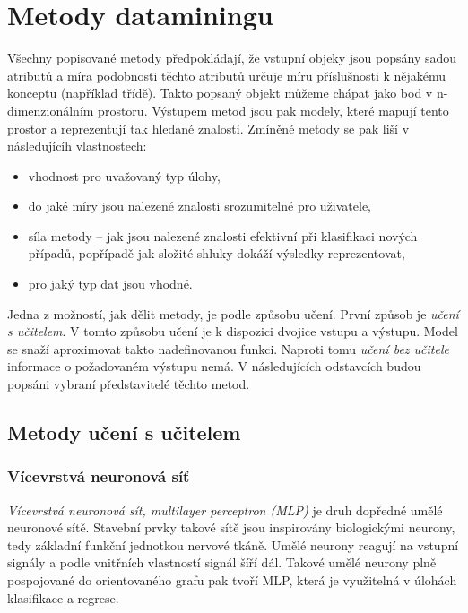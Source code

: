 \documentclass[thesis=M,czech]{FITthesis}[2012/06/26]
\begin{document}
 \section{Metody dataminingu}
Všechny popisované metody předpokládají, že vstupní objeky jsou popsány sadou atributů a míra podobnosti těchto atributů určuje míru příslušnosti k nějakému konceptu (například třídě). Takto popsaný objekt můžeme chápat jako bod v n-dimenzionálním prostoru. Výstupem metod jsou pak modely, které mapují tento prostor a reprezentují tak hledané znalosti.
Zmíněné metody se pak liší v následujícíh vlastnostech:


\begin{itemize}
\item vhodnost pro uvažovaný typ úlohy,
\item do jaké míry jsou nalezené znalosti srozumitelné pro uživatele,
\item síla metody -- jak jsou nalezené znalosti efektivní při klasifikaci nových případů, popřípadě jak složité shluky dokáží výsledky reprezentovat,
\item pro jaký typ dat jsou vhodné.
\end{itemize}


Jedna z možností, jak dělit metody, je podle způsobu učení. První způsob je \textit{učení s učitelem}. V tomto způsobu učení je k dispozici dvojice vstupu a výstupu. Model se snaží aproximovat takto nadefinovanou funkci. Naproti tomu \textit{učení bez učitele} informace o požadovaném výstupu nemá. V následujících odstavcích budou popsáni vybraní představitelé těchto metod.\cite{eurokomise}

 \subsection{Metody učení s učitelem}
  \subsubsection*{Vícevrstvá neuronová síť}
    \textit{Vícevrstvá neuronová síť, multilayer perceptron (MLP)} je druh dopředné umělé neuronové sítě.
Stavební prvky takové sítě jsou inspirovány biologickými neurony, tedy základní funkční jednotkou nervové tkáně. Umělé neurony reagují na vstupní signály a podle vnitřních vlastností signál šíří dál. Takové umělé neurony plně pospojované do orientovaného grafu pak tvoří MLP, která je využitelná v úlohách klasifikace a regrese. 
\end{document}
